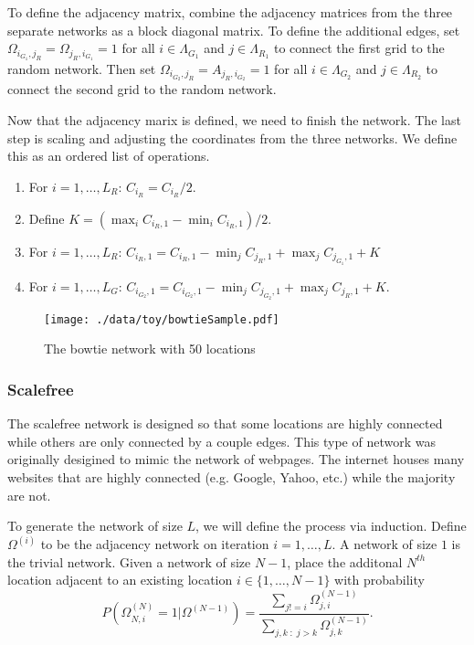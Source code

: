 \documentclass[11pt]{article}
\begin{document}
To define the adjacency matrix, combine the adjacency matrices from
the three separate networks as a block diagonal matrix.  To define the
additional edges, set $\Omega_{i_{G_1},j_R} = \Omega_{j_R,i_{G_1}} =
1$ for all $i \in \Lambda_{G_1}$ and $j \in \Lambda_{R_1}$ to connect
the first grid to the random network.  Then set $\Omega_{i_{G_2},j_R}
= A_{j_R,i_{G_2}} = 1$ for all $i \in \Lambda_{G_2}$ and $j \in
\Lambda_{R_2}$ to connect the second grid to the random network.

Now that the adjacency marix is defined, we need to finish the
network.  The last step is scaling and adjusting the coordinates from
the three networks.  We define this as an ordered list of operations.
\begin{enumerate}
  \item For $i=1,\ldots,L_R$: $C_{i_{R}} = C_{i_{R}}/2$.
  \item Define $K = (\max_i C_{i_{R},1} - \min_i C_{i_{R},1})/2$.
  \item For $i=1,\ldots,L_R$: $C_{i_{R},1} = C_{i_{R},1} -
  \min_j C_{j_{R},1} + \max_j C_{j_{G_1},1} + K$
  \item For $i=1,\ldots,L_G$:
  $C_{i_{G_2},1} = C_{i_{G_2},1} - \min_j C_{j_{G_2},1} + \max_j
  C_{j_{R},1} + K$.
\end{enumerate}


\begin{figure}[htb]
\centering
\texttt{[image: ./data/toy/bowtieSample.pdf]}
\caption{\label{fig:bowtie50}The bowtie network with 50 locations}
\end{figure}


\subsubsection{Scalefree}
\label{sec-3-1-6}

The scalefree network is designed so that some locations are highly
connected while others are only connected by a couple edges.  This
type of network was originally desigined to mimic the network of
webpages.  The internet houses many websites that are highly connected
(e.g. Google, Yahoo, etc.) while the majority are not.

To generate the network of size $L$, we will define the process via
induction.  Define $\Omega^{(i)}$ to be the adjacency network on
iteration $i = 1,\ldots,L$.  A network of size $1$ is the trivial
network.  Given a network of size $N-1$, place the additonal $N^{th}$
location adjacent to an existing location $i \in \lbrace
1,\ldots,N-1\rbrace$ with probability
\begin{equation*}
  P(\Omega^{(N)}_{N,i} = 1 | \Omega^{(N-1)}) = 
  \frac{\sum_{j!=i} \Omega^{(N-1)}_{j,i}}{\sum_{j,k \;:\; j > k} \Omega^{(N-1)}_{j,k}}.
\end{equation*}
\end{document}
